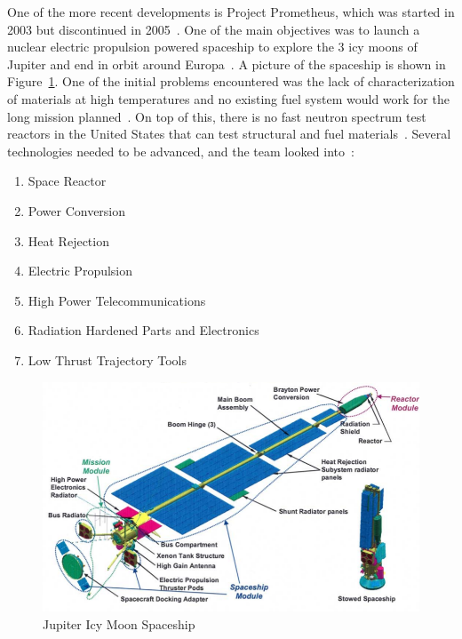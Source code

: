 \documentclass{article}
\begin{document}
    One of the more recent developments is Project Prometheus, which was started in 2003 but discontinued in 2005~\cite{taylor2005prometheus}. One of the main objectives was to launch a nuclear electric propulsion powered spaceship to explore the 3 icy moons of Jupiter and end in orbit around Europa~\cite{edwards2012overview}. A picture of the spaceship is shown in Figure~\ref{appS}. One of the initial problems encountered was the lack of characterization of materials at high temperatures and no existing fuel system would work for the long mission planned~\cite{wollman2006prometheus}. On top of this, there is no fast neutron spectrum test reactors in the United States that can test structural and fuel materials~\cite{wollman2006prometheus}. Several technologies needed to be advanced, and the team looked into~\cite{taylor2005prometheus}:
\begin{enumerate}
\item Space Reactor
\item Power Conversion
\item Heat Rejection
\item Electric Propulsion
\item High Power Telecommunications
\item Radiation Hardened Parts and Electronics
\item Low Thrust Trajectory Tools
\end{enumerate}


\begin{figure}[]
	\centering
	\includegraphics[height=0.45\textheight]{fig/appS}
	\caption[Jupiter Icy Moon Spaceship]{Jupiter Icy Moon Spaceship~\cite{edwards2012overview}}
	\label{appS}
\end{figure}
\end{document}
